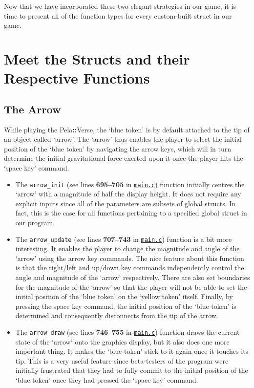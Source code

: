 \documentclass[11pt]{article}
\newcommand{\pelahverse}{Pela\hspace*{1pt}\textbf{::}Verse}
\newcommand{\lineref}[1]{lines \textbf{#1}}
\begin{document}
Now that we have incorporated these two elegant strategies in our game, it is time to present all of the function types for every custom-built struct in our game. 



\section{Meet the Structs and their Respective Functions}

\subsection{The Arrow}

While playing the \pelahverse{}, the `blue token' is by default attached to the tip of an object called `arrow'. The `arrow' thus enables the player to select the initial position of the `blue token' by navigating the arrow keys, which will in turn determine the initial gravitational force exerted upon it once the player hits the `space key' command.

\begin{itemize}
    \item The \texttt{arrow\_init} (see \lineref{695--705} in \hyperref[app:main-c]{\texttt{main.c}}) function initially centres the `arrow' with a magnitude of half the display height. It does not require any explicit inputs since all of the parameters are subsets of global structs. In fact, this is the case for all functions pertaining to a specified global struct in our program. 
    \item The \texttt{arrow\_update} (see \lineref{707--743} in \hyperref[app:main-c]{\texttt{main.c}}) function is a bit more interesting. It enables the player to change the magnitude and angle of the `arrow' using the arrow key commands. The nice feature about this function is that the right/left and up/down key commands independently control the angle and magnitude of the `arrow' respectively. There are also set boundaries for the magnitude of the `arrow' so that the player will not be able to set the initial position of the `blue token' on the `yellow token' itself. Finally, by pressing the space key command, the initial position of the `blue token' is determined and consequently disconnects from the tip of the arrow.  
    \item The \texttt{arrow\_draw} (see \lineref{746--755} in \hyperref[app:main-c]{\texttt{main.c}}) function draws the current state of the `arrow' onto the graphics display, but it also does one more important thing. It makes the `blue token' stick to it again once it touches its tip. This is a very useful feature since beta-testers of the program were initially frustrated that they had to fully commit to the initial position of the `blue token' once they had pressed the `space key' command. 
\end{itemize}
\end{document}
